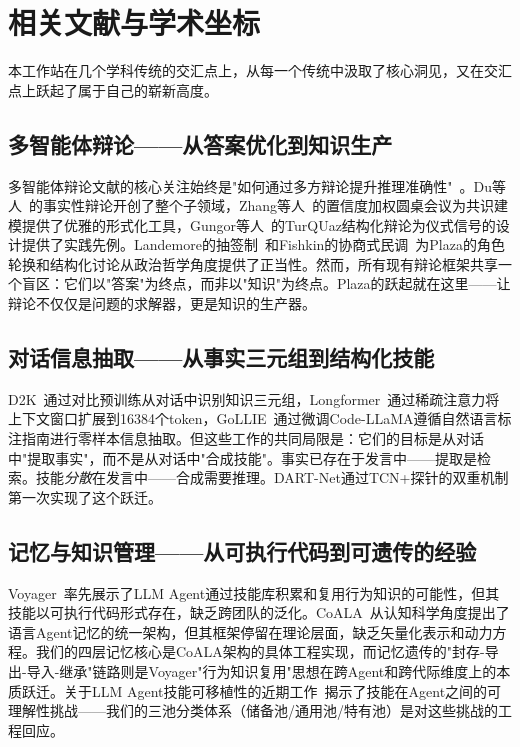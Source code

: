 \documentclass[12pt,a4paper]{ctexart}
\begin{document}
\section{相关文献与学术坐标}

本工作站在几个学科传统的交汇点上，从每一个传统中汲取了核心洞见，又在交汇点上跃起了属于自己的崭新高度。

\subsection{多智能体辩论——从答案优化到知识生产}

多智能体辩论文献的核心关注始终是"如何通过多方辩论提升推理准确性"~\cite{du2023improving,liang2023encouraging,zhang2024reconcile,xiong2023dubi}。Du等人~\cite{du2023improving}的事实性辩论开创了整个子领域，Zhang等人~\cite{zhang2024reconcile}的置信度加权圆桌会议为共识建模提供了优雅的形式化工具，Gungor等人~\cite{gungor2025turquaz}的TurQUaz结构化辩论为仪式信号的设计提供了实践先例。Landemore的抽签制~\cite{landemore2020open}和Fishkin的协商式民调~\cite{fishkin2018democracy}为Plaza的角色轮换和结构化讨论从政治哲学角度提供了正当性。然而，所有现有辩论框架共享一个盲区：它们以"答案"为终点，而非以"知识"为终点。Plaza的跃起就在这里——让辩论不仅仅是问题的求解器，更是知识的生产器。

\subsection{对话信息抽取——从事实三元组到结构化技能}

D2K~\cite{yu2022d2k}通过对比预训练从对话中识别知识三元组，Longformer~\cite{beltagy2020longformer}通过稀疏注意力将上下文窗口扩展到16384个token，GoLLIE~\cite{sainz2023gollie}通过微调Code-LLaMA遵循自然语言标注指南进行零样本信息抽取。但这些工作的共同局限是：它们的目标是从对话中"提取事实"，而不是从对话中"合成技能"。事实已存在于发言中——提取是检索。技能\emph{分散}在发言中——合成需要推理。DART-Net通过TCN+探针的双重机制第一次实现了这个跃迁。

\subsection{记忆与知识管理——从可执行代码到可遗传的经验}

Voyager~\cite{wang2023voyager}率先展示了LLM Agent通过技能库积累和复用行为知识的可能性，但其技能以可执行代码形式存在，缺乏跨团队的泛化。CoALA~\cite{sumers2023coala}从认知科学角度提出了语言Agent记忆的统一架构，但其框架停留在理论层面，缺乏矢量化表示和动力方程。我们的四层记忆核心是CoALA架构的具体工程实现，而记忆遗传的"封存-导出-导入-继承"链路则是Voyager"行为知识复用"思想在跨Agent和跨代际维度上的本质跃迁。关于LLM Agent技能可移植性的近期工作~\cite{skill_pseudocode2025,skill_comprehension2025}揭示了技能在Agent之间的可理解性挑战——我们的三池分类体系（储备池/通用池/特有池）是对这些挑战的工程回应。
\end{document}
